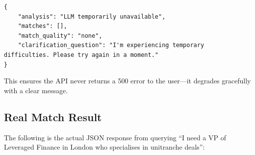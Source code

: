 \documentclass[12pt, a4paper]{report}
\begin{document}
\begin{lstlisting}[style=jsonstyle]
{
    "analysis": "LLM temporarily unavailable",
    "matches": [],
    "match_quality": "none",
    "clarification_question": "I'm experiencing temporary difficulties. Please try again in a moment."
}
\end{lstlisting}

This ensures the API never returns a 500 error to the user---it degrades gracefully with a clear message.

\subsection{Real Match Result}

The following is the actual JSON response from querying ``I need a VP of Leveraged Finance in London who specialises in unitranche deals'':
\end{document}
